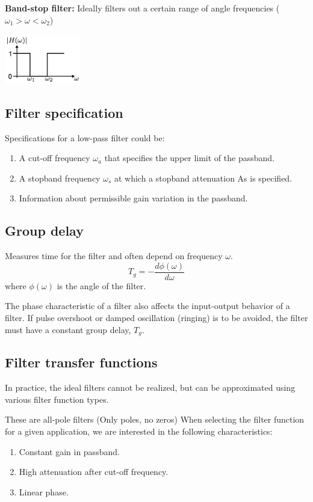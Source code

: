 \textbf{Band-stop filter:} Ideally filters out a certain range of angle frequencies ($\omega_{1}>\omega<\omega_{2}$) 
\begin{center}
  \includegraphics[width=0.25\textwidth]{Images/Bandstop.png}
\end{center}

\subsection{Filter specification}
Specifications for a low-pass filter could be:
\begin{enumerate}
  \item A cut-off frequency $\omega_{a}$ that specifies the upper limit of the passband.
  \item A stopband frequency $\omega_{s}$ at which a stopband attenuation As is specified. 
  \item Information about permissible gain variation in the passband.
\end{enumerate}


\subsection{Group delay}
Measures time for the filter and often depend on frequency $\omega$.
$$T_{g}=-\frac{ d\phi(\omega) }{ d\omega } $$
where $\phi(\omega)$ is the angle of the filter.

The phase characteristic of a filter also affects the input-output behavior of a filter. If pulse overshoot or damped oscillation (ringing) is to be avoided, the filter must have a constant group delay, $T_{g}$.

\subsection{Filter transfer functions}
In practice, the ideal filters cannot be realized, but can be approximated using various filter function types.

These are all-pole filters (Only poles, no zeros)
When selecting the filter function for a given application, we are interested in the following characteristics:
\begin{enumerate}
  \item Constant gain in passband.
  \item High attenuation after cut-off frequency.
  \item Linear phase.
\end{enumerate}


